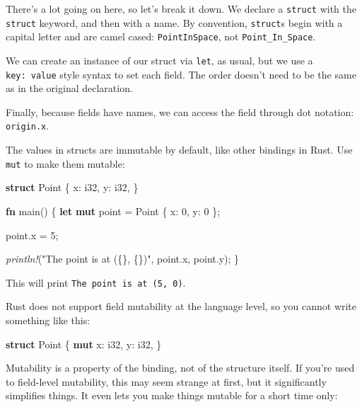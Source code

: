\documentclass[a4paper,]{book}
\newenvironment{Shaded}{\begin{snugshade}}{\end{snugshade}}
\newcommand{\KeywordTok}[1]{\textcolor[rgb]{0.13,0.29,0.53}{\textbf{{#1}}}}
\newcommand{\DataTypeTok}[1]{\textcolor[rgb]{0.13,0.29,0.53}{{#1}}}
\newcommand{\DecValTok}[1]{\textcolor[rgb]{0.00,0.00,0.81}{{#1}}}
\newcommand{\StringTok}[1]{\textcolor[rgb]{0.31,0.60,0.02}{{#1}}}
\newcommand{\PreprocessorTok}[1]{\textcolor[rgb]{0.56,0.35,0.01}{\textit{{#1}}}}
\newcommand{\NormalTok}[1]{{#1}}
\begin{document}
There's a lot going on here, so let's break it down. We declare a
\texttt{struct} with the \texttt{struct} keyword, and then with a name.
By convention, \texttt{struct}s begin with a capital letter and are
camel cased: \texttt{PointInSpace}, not \texttt{Point\_In\_Space}.

We can create an instance of our struct via \texttt{let}, as usual, but
we use a \texttt{key:\ value} style syntax to set each field. The order
doesn't need to be the same as in the original declaration.

Finally, because fields have names, we can access the field through dot
notation: \texttt{origin.x}.

The values in structs are immutable by default, like other bindings in
Rust. Use \texttt{mut} to make them mutable:

\begin{Shaded}
\begin{Highlighting}[]
\KeywordTok{struct} \NormalTok{Point \{}
    \NormalTok{x: }\DataTypeTok{i32}\NormalTok{,}
    \NormalTok{y: }\DataTypeTok{i32}\NormalTok{,}
\NormalTok{\}}

\KeywordTok{fn} \NormalTok{main() \{}
    \KeywordTok{let} \KeywordTok{mut} \NormalTok{point = Point \{ x: }\DecValTok{0}\NormalTok{, y: }\DecValTok{0} \NormalTok{\};}

    \NormalTok{point.x = }\DecValTok{5}\NormalTok{;}

    \PreprocessorTok{println!}\NormalTok{(}\StringTok{"The point is at (\{\}, \{\})"}\NormalTok{, point.x, point.y);}
\NormalTok{\}}
\end{Highlighting}
\end{Shaded}

This will print \texttt{The\ point\ is\ at\ (5,\ 0)}.

Rust does not support field mutability at the language level, so you
cannot write something like this:

\begin{Shaded}
\begin{Highlighting}[]
\KeywordTok{struct} \NormalTok{Point \{}
    \KeywordTok{mut} \NormalTok{x: }\DataTypeTok{i32}\NormalTok{,}
    \NormalTok{y: }\DataTypeTok{i32}\NormalTok{,}
\NormalTok{\}}
\end{Highlighting}
\end{Shaded}

Mutability is a property of the binding, not of the structure itself. If
you're used to field-level mutability, this may seem strange at first,
but it significantly simplifies things. It even lets you make things
mutable for a short time only:
\end{document}
